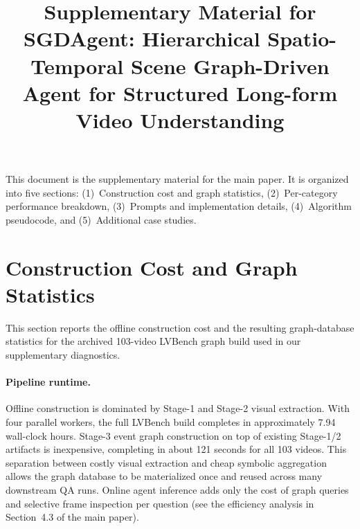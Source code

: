 \documentclass[sigconf, screen, review, anonymous]{acmart}
\begin{document}
\title{Supplementary Material for SGDAgent: Hierarchical Spatio-Temporal Scene Graph-Driven Agent for Structured Long-form Video Understanding}



\maketitle

\makeatletter

\def\hyper@natlinkstart#1{}
\def\hyper@natlinkend{}
\def\hyper@natanchorstart#1{}
\def\hyper@natanchorend{}
\makeatother

\setcounter{figure}{3}
\setcounter{table}{5}

\noindent This document is the supplementary material for the main paper. It is organized into five sections:
(1)~Construction cost and graph statistics,
(2)~Per-category performance breakdown,
(3)~Prompts and implementation details,
(4)~Algorithm pseudocode, and
(5)~Additional case studies.

\section{Construction Cost and Graph Statistics}
\label{sec:cost}

This section reports the offline construction cost and the resulting graph-database statistics for the archived 103-video LVBench\cite{lvbench} graph build used in our supplementary diagnostics.

\paragraph{Pipeline runtime.}
Offline construction is dominated by Stage-1 and Stage-2 visual extraction. With four parallel workers, the full LVBench\cite{lvbench} build completes in approximately 7.94 wall-clock hours. Stage-3 event graph construction on top of existing Stage-1/2 artifacts is inexpensive, completing in about 121 seconds for all 103 videos. This separation between costly visual extraction and cheap symbolic aggregation allows the graph database to be materialized once and reused across many downstream QA runs. Online agent inference adds only the cost of graph queries and selective frame inspection per question (see the efficiency analysis in Section~4.3 of the main paper).
\end{document}
